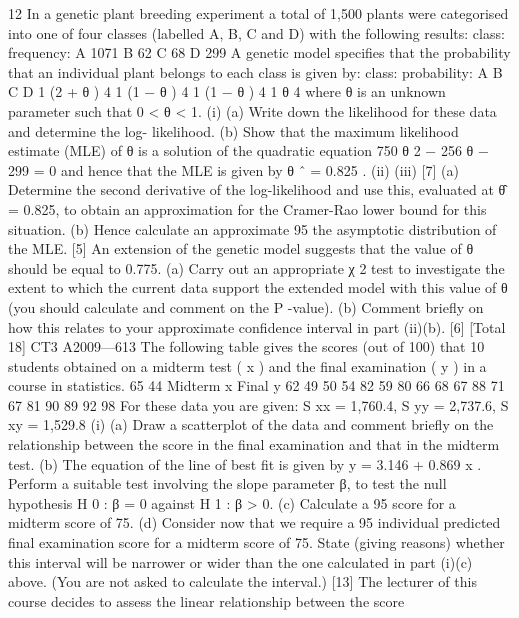 \documentclass[a4paper,12pt]{article}
\begin{document}
\begin{enumerate}

12
In a genetic plant breeding experiment a total of 1,500 plants were categorised into
one of four classes (labelled A, B, C and D) with the following results:
class:
frequency:
A
1071
B
62
C
68
D
299
A genetic model specifies that the probability that an individual plant belongs to each
class is given by:
class:
probability:
A B C D
1
(2 + θ )
4 1
(1 − θ )
4 1
(1 − θ )
4 1
θ
4
where θ is an unknown parameter such that 0 < θ < 1.
(i)
(a) Write down the likelihood for these data and determine the log-
likelihood.
(b) Show that the maximum likelihood estimate (MLE) of θ is a solution
of the quadratic equation
750 θ 2 − 256 θ − 299 = 0
and hence that the MLE is given by θ ˆ = 0.825 .
(ii)
(iii)
[7]
(a) Determine the second derivative of the log-likelihood and use this,
evaluated at θ̂ = 0.825, to obtain an approximation for the Cramer-Rao
lower bound for this situation.
(b) Hence calculate an approximate 95%
the asymptotic distribution of the MLE.
[5]
An extension of the genetic model suggests that the value of θ should be equal
to 0.775.
(a) Carry out an appropriate χ 2 test to investigate the extent to which the
current data support the extended model with this value of θ (you
should calculate and comment on the P -value).
(b) Comment briefly on how this relates to your approximate confidence
interval in part (ii)(b).
[6]
[Total 18]
CT3 A2009—613
The following table gives the scores (out of 100) that 10 students obtained on a
midterm test ( x ) and the final examination ( y ) in a course in statistics.
65
44
Midterm x
Final y
62
49
50
54
82
59
80
66
68
67
88
71
67
81
90
89
92
98
For these data you are given: S xx = 1,760.4, S yy = 2,737.6, S xy = 1,529.8
(i)
(a) Draw a scatterplot of the data and comment briefly on the relationship
between the score in the final examination and that in the midterm test.
(b) The equation of the line of best fit is given by y = 3.146 + 0.869 x .
Perform a suitable test involving the slope parameter β, to test the null
hypothesis H 0 : β = 0 against H 1 : β > 0.
(c) Calculate a 95%
score for a midterm score of 75.
(d) Consider now that we require a 95%
individual predicted final examination score for a midterm score of 75.
State (giving reasons) whether this interval will be narrower or wider
than the one calculated in part (i)(c) above. (You are not asked to
calculate the interval.)
[13]
The lecturer of this course decides to assess the linear relationship between the score

\end{enumerate}
\end{document}
